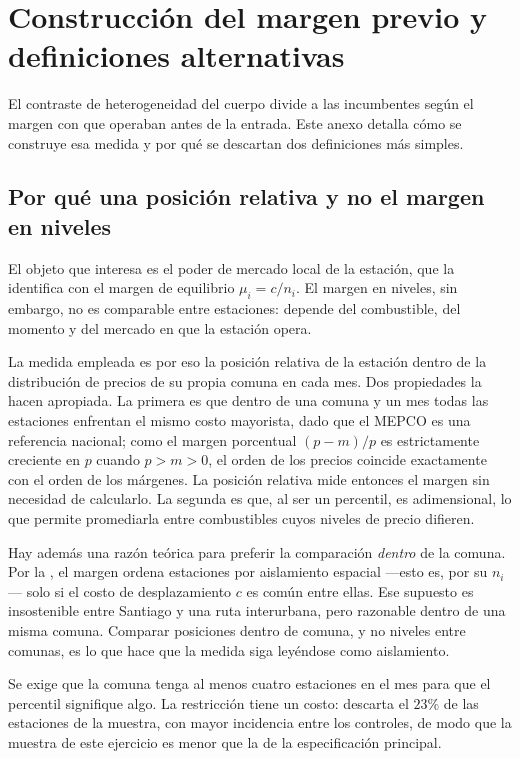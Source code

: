 \section{Construcción del margen previo y definiciones alternativas}
\label{anexo:moderador}

El contraste de heterogeneidad del cuerpo divide a las incumbentes según el
margen con que operaban antes de la entrada. Este anexo detalla cómo se
construye esa medida y por qué se descartan dos definiciones más simples.

\subsection{Por qué una posición relativa y no el margen en niveles}

El objeto que interesa es el poder de mercado local de la estación, que la
 identifica con el margen de equilibrio $\mu_i = c/n_i$.
El margen en niveles, sin embargo, no es comparable entre estaciones: depende
del combustible, del momento y del mercado en que la estación opera.

La medida empleada es por eso la posición relativa de la estación dentro de la
distribución de precios de su propia comuna en cada mes. Dos propiedades la
hacen apropiada. La primera es que dentro de una comuna y un mes todas las
estaciones enfrentan el mismo costo mayorista, dado que el MEPCO es una
referencia nacional; como el margen porcentual $(p - m)/p$ es estrictamente
creciente en $p$ cuando $p > m > 0$, el orden de los precios coincide
exactamente con el orden de los márgenes. La posición relativa mide entonces el
margen sin necesidad de calcularlo. La segunda es que, al ser un percentil, es
adimensional, lo que permite promediarla entre combustibles cuyos niveles de
precio difieren.

Hay además una razón teórica para preferir la comparación \emph{dentro} de la
comuna. Por la , el margen ordena estaciones por aislamiento
espacial —esto es, por su $n_i$— solo si el costo de desplazamiento $c$ es común
entre ellas. Ese
supuesto es insostenible entre Santiago y una ruta interurbana, pero razonable
dentro de una misma comuna. Comparar posiciones dentro de comuna, y no niveles
entre comunas, es lo que hace que la medida siga leyéndose como aislamiento.

Se exige que la comuna tenga al menos cuatro estaciones en el mes para que el
percentil signifique algo. La restricción tiene un costo: descarta el $23\%$ de
las estaciones de la muestra, con mayor incidencia entre los controles, de modo
que la muestra de este ejercicio es menor que la de la especificación principal.

